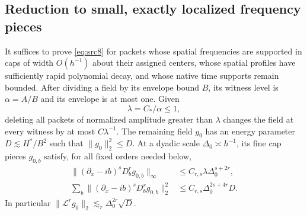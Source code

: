 \subsection{Reduction to small, exactly localized frequency pieces}

\begin{lemma}
\label{lem:frame-initial}
It suffices to prove \eqref{eq:src8} for packets whose spatial
frequencies are supported in caps of width $O(h^{-1})$ about their
assigned centers, whose spatial profiles have sufficiently rapid
polynomial decay, and whose native time supports remain bounded.
After dividing a field by its envelope bound $B$, its witness level is
$\alpha=A/B$ and its envelope is at most one.  Given
\[
 \lambda=C_*/\alpha\leq1,
\]
deleting all packets of normalized amplitude greater than $\lambda$
changes the field at every witness by at most $C\lambda^{-1}$.
The remaining field $g_0$ has an energy parameter
$D\lesssim H^*/B^2$ such that $\|g_0\|_2^2\leq D$.  At a dyadic
scale $\Delta_0\asymp h^{-1}$, its fine cap pieces $g_{0,b}$ satisfy,
for all fixed orders needed below,
\begin{align}
 \| (\partial_x-ib)^sD_b^r g_{0,b}\|_\infty
 &\leq C_{r,s}\lambda\Delta_0^{s+2r},
 \label{eq:frame-initial-sup}\\
 \sum_b\|(\partial_x-ib)^sD_b^r g_{0,b}\|_2^2
 &\leq C_{r,s}\Delta_0^{2s+4r}D.
 \label{eq:frame-initial-square}
\end{align}
In particular $\|\mathcal L^r g_0\|_2\lesssim_r
\Delta_0^{2r}\sqrt D$.
\end{lemma}

